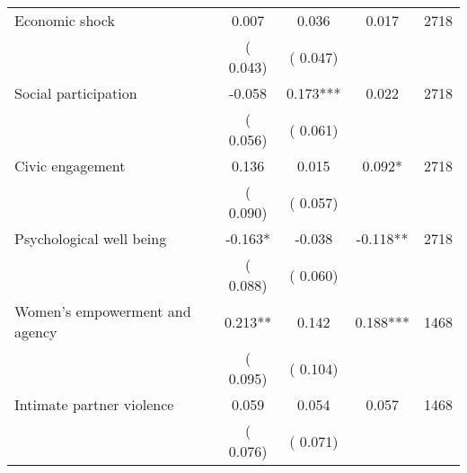 \begin{tabular}{l*{4}{c}}
 Economic shock &              0.007 &         0.036 &           0.017 & 2718                       \\  
                 &        (       0.043)                   &        (       0.047)                        &                                                             &                                                      \\      

 Social participation &             -0.058 &         0.173*** &           0.022 & 2718                       \\  
                 &        (       0.056)                   &        (       0.061)                        &                                                             &                                                      \\      

 Civic engagement &              0.136 &         0.015 &           0.092* & 2718                       \\  
                 &        (       0.090)                   &        (       0.057)                        &                                                             &                                                      \\      

 Psychological well being &             -0.163* &        -0.038 &          -0.118** & 2718                       \\  
                 &        (       0.088)                   &        (       0.060)                        &                                                             &                                                      \\      

 Women's empowerment and agency &              0.213** &         0.142 &           0.188*** & 1468                       \\  
                 &        (       0.095)                   &        (       0.104)                        &                                                             &                                                      \\      

 Intimate partner violence &              0.059 &         0.054 &           0.057 & 1468                       \\  
                 &        (       0.076)                   &        (       0.071)                        &                                                             &                                                      \\      

\hline \end{tabular}                                                                                                              

